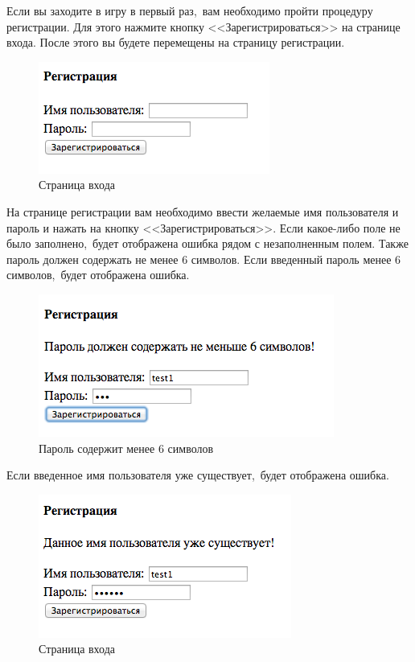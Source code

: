 \documentclass[14pt,a4paper]{report}
\begin{document}
Если вы заходите в игру в первый раз,~вам необходимо пройти процедуру регистрации. Для этого нажмите кнопку <<Зарегистрироваться>> на странице входа. После этого вы будете перемещены на страницу регистрации.
\begin{figure}[H]
\centerline{\includegraphics[scale=0.5]{gfx/4_register.png}}
\caption{Страница входа}
\label{fig:register}
\end{figure}
На странице регистрации вам необходимо ввести желаемые имя пользователя и пароль и нажать на кнопку <<Зарегистрироваться>>. Если какое-либо поле не было заполнено,~будет отображена ошибка рядом с незаполненным полем. Также пароль должен содержать не менее 6 символов. Если введенный пароль менее 6 символов,~будет отображена ошибка.
\begin{figure}[H]
\centerline{\includegraphics[scale=0.5]{gfx/5_register_nopass.png}}
\caption{Пароль содержит менее 6 символов}
\label{fig:register_nopass}
\end{figure}
Если введенное имя пользователя уже существует,~будет отображена ошибка.
\begin{figure}[H]
\centerline{\includegraphics[scale=0.5]{gfx/6_register_exists.png}}
\caption{Страница входа}
\label{fig:register_exists}
\end{figure}
\end{document}
